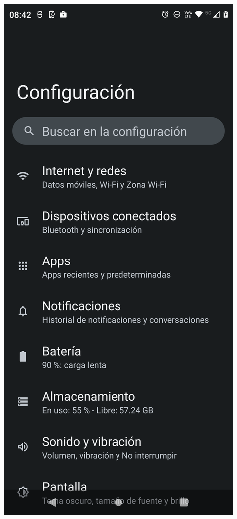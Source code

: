 \begin{frame}
\begin{columns}
\begin{center}
\end{center}
\begin{center}
\includegraphics[width=0.95\linewidth]{01_Configurar/ModoDesarrollador2.png}    

\end{center}
\end{columns}
\end{frame}
